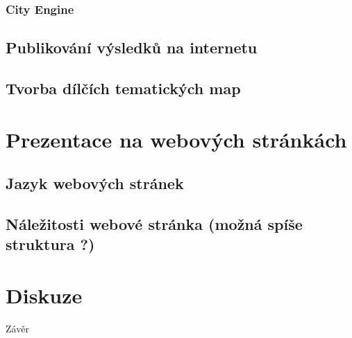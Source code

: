 \documentclass[thesis=M,czech]{FITthesis}[2012/06/26]
\begin{document}
\subsection{City Engine}

\section{Publikování výsledků na internetu}

\section{Tvorba dílčích tematických map}


\chapter{Prezentace na webových stránkách}

\section{Jazyk webových stránek}

\section{Náležitosti webové stránka (možná spíše struktura ?)}


\chapter{Diskuze}



\begin{conclusion}
Závěr
\end{conclusion}




\appendix
\end{document}
